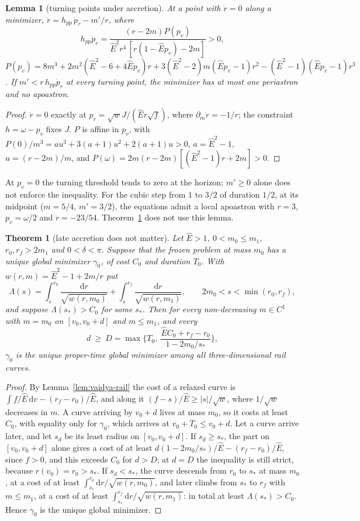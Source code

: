 \documentclass[aip,jmp,amsmath,amssymb,reprint]{revtex4-2}
\newcommand{\Ehat}{\hat E}
\newcommand{\dd}{\mathrm{d}}
\theoremstyle{plain}
\newtheorem{theorem}{Theorem}
\newtheorem{lemma}[proposition]{Lemma}
\theoremstyle{definition}
\begin{document}
\begin{lemma}[turning points under accretion]\label{lem:vaidya-turn}
At a point with $\dot r=0$ along a minimizer, $\ddot r=h_{pp}\,\dot p_r-m'/r$, where
\[
  h_{pp}\dot p_r=\frac{(r-2m)P(p_v)}{\Ehat^2r^4\,[r(1-\Ehat p_v)-2m]}>0,
\]
$P(p_v)=8m^3+2m^2(\Ehat^2-6+4\Ehat p_v)r+3(\Ehat^2-2)m(\Ehat p_v-1)r^2-(\Ehat^2-1)(\Ehat p_v-1)r^3$. If
$m'<r\,h_{pp}\dot p_r$ at every turning point, the minimizer has at most one periastron and no apoastron.
\end{lemma}

\begin{proof}
$\dot r=0$ exactly at $p_r=\sqrt wJ/(\Ehat r\sqrt f)$, where $\partial_m\dot r=-1/r$; the constraint $h=\omega-p_v$
fixes $J$. $P$ is affine in $p_v$, with $P(0)/m^3=au^3+3(a+1)u^2+2(a+1)u>0$, $a=\Ehat^2-1$, $u=(r-2m)/m$, and
$P(\omega)=2m(r-2m)[(\Ehat^2-1)r+2m]>0$.
\end{proof}

At $p_v=0$ the turning threshold tends to zero at the horizon; $m'\ge0$ alone does not enforce the
inequality. For the cubic step from $1$ to $3/2$ of duration $1/2$, at its midpoint ($m=5/4$, $m'=3/2$), the
equations admit a local apoastron with $r=3$, $p_v=\omega/2$ and $\ddot r=-23/54$. Theorem~\ref{thm:vaidya-late} does not use this lemma.

\begin{theorem}[late accretion does not matter]\label{thm:vaidya-late}
Let $\Ehat>1$, $0<m_0\le m_1$, $r_0,r_f>2m_1$ and $0<\delta<\pi$. Suppose that the frozen problem at mass $m_0$
has a unique global minimizer $\gamma_0$, of cost $C_0$ and duration $T_0$. With $w(r,m)=\Ehat^2-1+2m/r$ put
\[
  \Lambda(s)=\int_s^{r_0}\frac{\dd r}{\sqrt{w(r,m_0)}}+\int_s^{r_f}\frac{\dd r}{\sqrt{w(r,m_1)}},\qquad
  2m_0<s<\min(r_0,r_f),
\]
and suppose $\Lambda(s_*)>C_0$ for some $s_*$. Then for every non-decreasing $m\in C^1$ with $m=m_0$ on
$[v_0,v_0+d]$ and $m\le m_1$, and every
\[
  d\ \ge\ D=\max\Big\{T_0,\ \frac{\Ehat C_0+r_f-r_0}{1-2m_0/s_*}\Big\},
\]
$\gamma_0$ is the unique proper-time global minimizer among all three-dimensional rail curves.
\end{theorem}

\begin{proof}
By Lemma~\ref{lem:vaidya-rail} the cost of a relaxed curve is $\int f/\Ehat\,\dd v-(r_f-r_0)/\Ehat$, and along
it $(f-s)/\Ehat\ge|s|/\sqrt w$, where $1/\sqrt w$ decreases in $m$. A curve arriving by $v_0+d$ lives at
mass $m_0$, so it costs at least $C_0$, with equality only for $\gamma_0$, which arrives at $v_0+T_0\le v_0+d$.
Let a curve arrive later, and let $s_d$ be its least radius on $[v_0,v_0+d]$. If $s_d\ge s_*$, the part
on $[v_0,v_0+d]$ alone gives a cost of at least $d(1-2m_0/s_*)/\Ehat-(r_f-r_0)/\Ehat$, since $f>0$, and this exceeds
$C_0$ for $d>D$; at $d=D$ the inequality is still strict, because $r(v_0)=r_0>s_*$. If $s_d<s_*$, the curve
descends from $r_0$ to $s_*$ at mass $m_0$, at a cost of at least $\int_{s_*}^{r_0}\dd r/\sqrt{w(r,m_0)}$, and later
climbs from $s_*$ to $r_f$ with $m\le m_1$, at a cost of at least $\int_{s_*}^{r_f}\dd r/\sqrt{w(r,m_1)}$: in total
at least $\Lambda(s_*)>C_0$. Hence $\gamma_0$ is the unique global minimizer.
\end{proof}
\end{document}
